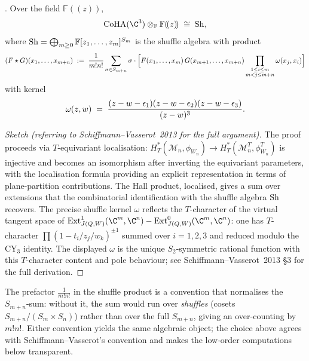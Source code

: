 \begin{theorem}
\label{opus:thm:sv-shuffle}
\ClaimStatusTheorem. Over the field $\mathbb{F}(\!(z)\!)$,
\[
 \CoHA(\C^3) \otimes_{\mathbb{F}} \mathbb{F}(\!(z)\!) \;\cong\; \Sh,
\]
where $\mathrm{Sh} = \bigoplus_{m \geq 0} \mathbb{F}[z_1, \ldots, z_m]^{S_m}$ is the
shuffle algebra with product
\[
 (F \star G)(x_1, \ldots, x_{m+n})
 \;:=\; \frac{1}{m! n!} \sum_{\sigma \in S_{m+n}} \sigma \cdot \Bigl[
  F(x_1, \ldots, x_m)\, G(x_{m+1}, \ldots, x_{m+n})
  \prod_{\substack{1 \leq i \leq m \\ m < j \leq m+n}} \omega(x_j, x_i)
 \Bigr]
\]
with kernel
\[
 \omega(z, w) \;=\; \frac{(z - w - \epsilon_1)(z - w - \epsilon_2)(z - w - \epsilon_3)}{(z - w)^3}.
\]
\end{theorem}

\begin{proof}[Sketch (referring to Schiffmann--Vasserot~2013 for the full argument)]
The proof proceeds via $T$-equivariant localisation: $H^*_T(\mathcal{M}_n, \phi_{W_n})
\to H^*_T(\mathcal{M}_n^T, \phi_{W_n}^T)$ is injective and becomes an isomorphism
after inverting the equivariant parameters, with the localisation formula
providing an explicit representation in terms of plane-partition contributions.
The Hall product, localised, gives a sum over extensions that the combinatorial
identification with the shuffle algebra $\mathrm{Sh}$ recovers. The precise shuffle kernel
$\omega$ reflects the $T$-character of the virtual tangent space of
$\operatorname{Ext}^1_{\Jac(Q,W)}(\C^m, \C^n) - \operatorname{Ext}^0_{\Jac(Q,W)}(\C^m, \C^n)$:
one has $T$-character $\prod (1 - t_i/z_j/w_k)^{\pm 1}$ summed over $i = 1, 2, 3$
and reduced modulo the CY$_3$ identity. The displayed $\omega$ is the unique
$S_2$-symmetric rational function with this $T$-character content and pole
behaviour; see Schiffmann--Vasserot~2013 \S3 for the full derivation.
\end{proof}

\begin{remark}
\label{opus:rem:shuffle-prefactor}
The prefactor $\frac{1}{m!n!}$ in the shuffle product is a convention that
normalises the $S_{m+n}$-sum: without it, the sum would run over \emph{shuffles}
(cosets $S_{m+n}/(S_m \times S_n)$) rather than over the full $S_{m+n}$, giving
an over-counting by $m!n!$. Either convention yields the same algebraic object;
the choice above agrees with Schiffmann--Vasserot's convention and makes the
low-order computations below transparent.
\end{remark}

